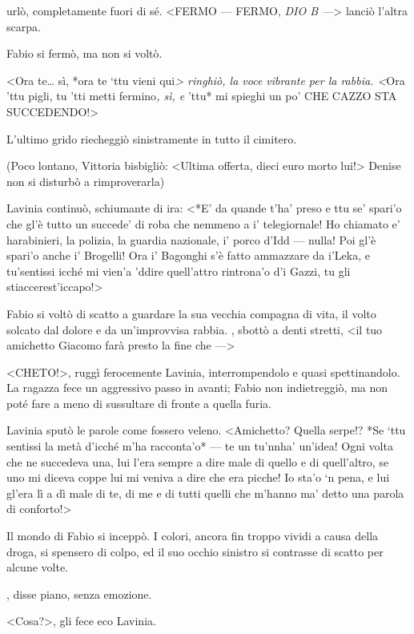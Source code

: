  urlò, completamente fuori di sé. \textless{}FERMO --- FERMO, \emph{DIO
B ---}\textgreater{} lanciò l'altra scarpa.

Fabio si fermò, ma non si voltò.

\textless{}Ora te\ldots{} sì, *ora te `ttu vieni qui\emph{\textgreater{}
ringhiò, la voce vibrante per la rabbia. \textless{}}Ora 'ttu pigli, tu
'tti metti fermino\emph{, sì, e }'ttu* mi spieghi un po' CHE CAZZO STA
SUCCEDENDO!\textgreater{}

L'ultimo grido riecheggiò sinistramente in tutto il cimitero.

(Poco lontano, Vittoria bisbigliò: \textless{}Ultima offerta, dieci euro
morto lui!\textgreater{} Denise non si disturbò a rimproverarla)

Lavinia continuò, schiumante di ira: \textless{}*E' da quande t'ha'
preso e ttu se' spari'o che gl'è tutto un succede' di roba che nemmeno a
i' telegiornale! Ho chiamato e' harabinieri, la polizia, la guardia
nazionale, i' porco d'Idd --- nulla! Poi gl'è spari'o anche i' Brogelli!
Ora i' Bagonghi s'è fatto ammazzare da i'Leka, e tu'sentissi icché mi
vien'a 'ddire quell'attro rintrona'o d'i Gazzi, tu gli
stiaccerest'iccapo!\textgreater{}

Fabio si voltò di scatto a guardare la sua vecchia compagna di vita, il
volto solcato dal dolore e da un'improvvisa rabbia. , sbottò a denti
stretti, \textless{}il tuo amichetto Giacomo farà presto la fine che
---\textgreater{}

\textless{}CHETO!\textgreater{}, ruggì ferocemente Lavinia,
interrompendolo e quasi spettinandolo. La ragazza fece un aggressivo
passo in avanti; Fabio non indietreggiò, ma non poté fare a meno di
sussultare di fronte a quella furia.

Lavinia sputò le parole come fossero veleno. \textless{}Amichetto?
Quella serpe!? *Se `ttu sentissi la metà d'icché m'ha racconta'o* --- te
un tu'nnha' un'idea! Ogni volta che ne succedeva una, lui l'era sempre a
dire male di quello e di quell'altro, se uno mi diceva coppe lui mi
veniva a dire che era picche! Io sta'o `n pena, e lui gl'era lì a dì
male di te, di me e di tutti quelli che m'hanno ma' detto una parola di
conforto!\textgreater{}

Il mondo di Fabio si inceppò. I colori, ancora fin troppo vividi a causa
della droga, si spensero di colpo, ed il suo occhio sinistro si
contrasse di scatto per alcune volte.

, disse piano, senza emozione.

\textless{}Cosa?\textgreater{}, gli fece eco Lavinia.


